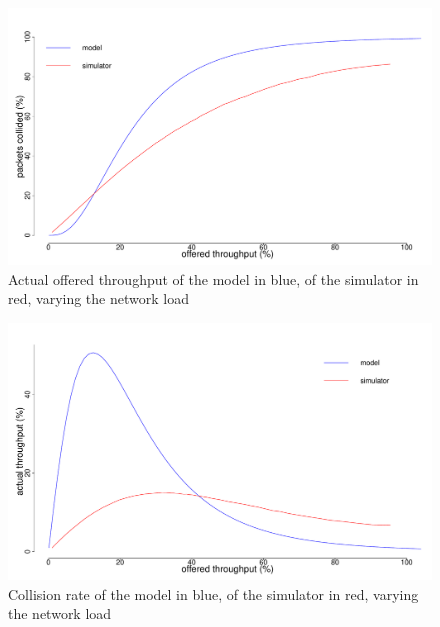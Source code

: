 \documentclass[conference]{IEEEtran}
\begin{document}
\begin{figure}[t]
    \centering
    \includegraphics[width=\columnwidth]{graphs/Model1}
    \caption{Actual offered throughput of the model in blue, of the simulator in red, varying the network load}
    \label{grph:model1}
\end{figure}

\begin{figure}[t]
    \centering
    \includegraphics[width=\columnwidth]{graphs/Model2}
    \caption{Collision rate of the model in blue, of the simulator in red, varying the network load}
    \label{grph:model2}
\end{figure}
\end{document}
